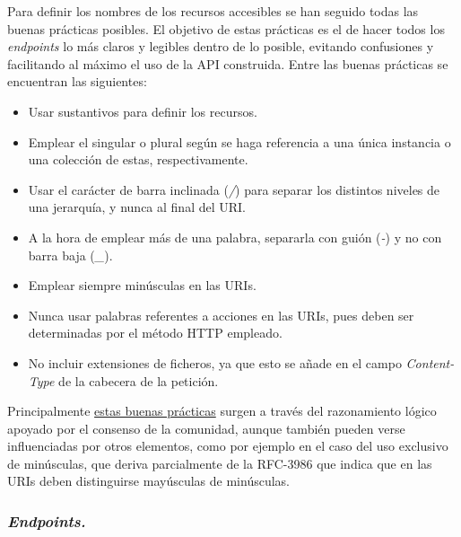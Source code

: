 Para definir los nombres de los recursos accesibles se han seguido todas las buenas prácticas posibles. El objetivo de estas prácticas es el de hacer todos los \textit{endpoints} lo más claros y legibles dentro de lo posible, evitando confusiones y facilitando al máximo el uso de la API construida. Entre las buenas prácticas se encuentran las siguientes:

\begin{itemize}
    \item Usar sustantivos para definir los recursos.
    \item Emplear el singular o plural según se haga referencia a una única instancia o una colección de estas, respectivamente.
    \item Usar el carácter de barra inclinada (\textit{/}) para separar los distintos niveles de una jerarquía, y nunca al final del URI.
    \item A la hora de emplear más de una palabra, separarla con guión (\textit{-}) y no con barra baja (\textit{\_}).
    \item Emplear siempre minúsculas en las URIs.
    \item Nunca usar palabras referentes a acciones en las URIs, pues deben ser determinadas por el método HTTP empleado.
    \item No incluir extensiones de ficheros, ya que esto se añade en el campo \textit{Content-Type} de la cabecera de la petición.
\end{itemize}

Principalmente \href{https://restfulapi.net/resource-naming/}{estas buenas prácticas} surgen a través del razonamiento lógico apoyado por el consenso de la comunidad, aunque también pueden verse influenciadas por otros elementos, como por ejemplo en el caso del uso exclusivo de minúsculas, que deriva parcialmente de la RFC-3986\cite{URIRFC} que indica que en las URIs deben distinguirse mayúsculas de minúsculas.

\subsubsection{\textit{Endpoints.}}

